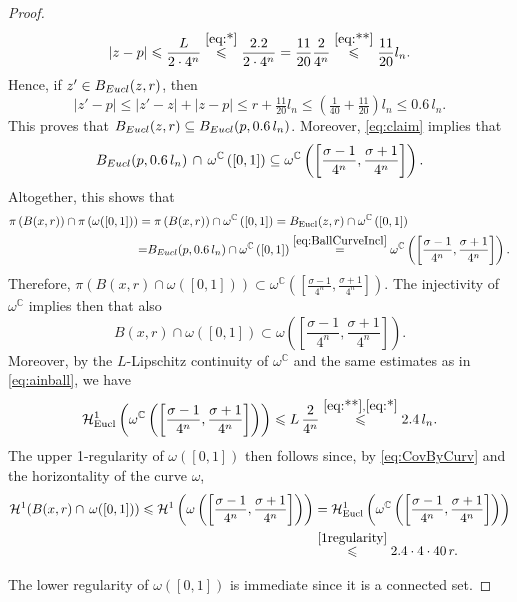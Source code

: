\documentclass[10pt,a4paper]{amsart}
\newcommand{\C}{\mathbb C}
\renewcommand{\leq}{\leqslant}
\begin{document}
\begin{proof}
  \[|z-p|\leq \frac{L}{2\cdot 4^n}\overset{\eqref{eq:*}}{\leq} \frac{2.2}{2\cdot 4^n}=\frac{11}{20}\frac{2}{4^n}\overset{\eqref{eq:**}}{\leq} \frac{11}{20}l_n.\]
  Hence, if $z'\in B_{\rm Eucl}(z,r)$, then
  \[|z'-p|\leq |z'-z|+|z-p|\leq r+\tfrac{11}{20} l_n\leq \left(\tfrac{1}{40}+\tfrac{11}{20}\right)l_n\leq 0.6\, l_n.\]
  This proves that $B_{\rm Eucl}(z,r)\subseteq B_{\rm Eucl}(p,0.6\,l_n)$. Moreover, \eqref{eq:claim} implies that
  \begin{equation}\label{eq:BallCurveIncl}
B_{\rm Eucl}(p,0.6\, l_n)\,\cap\,\omega^\C\left([0,1]\right)\subseteq \omega^\C\left(\left[\frac{\sigma-1}{4^n},\frac{\sigma +1}{4^n}\right]\right).
  \end{equation}
  Altogether, this shows that
  \begin{align*}
      \pi\left(B(x,r)\right)\cap \pi\left(\omega([0,1])\right)
     & = \pi\left(B(x,r)\right)\cap \omega^{\mathbb{C}}\left([0,1] \right)=B_{\mathrm{Eucl}}(z,r)\cap \omega^{\mathbb{C}}\left([0,1]\right)\\
  &{=}  B_{\rm Eucl}(p,0.6\,l_n)\cap \omega^{\mathbb{C}}\left([0,1]\right)
 \overset{\eqref{eq:BallCurveIncl}}{=} \omega^\C\left(\left[\frac{\sigma-1}{4^n},\frac{\sigma +1}{4^n}\right]\right).
  \end{align*}
Therefore, $\pi\left(B(x,r)\cap \omega([0,1])\right)\subset \omega^\C\left(\left[\frac{\sigma-1}{4^n},\frac{\sigma +1}{4^n}\right]\right)$. The injectivity of $\omega^{\mathbb{C}}$  implies then that also
\begin{equation}\label{eq:CovByCurv}
    B(x,r)\cap \omega([0,1]) \subset \omega\left(\left[\frac{\sigma-1}{4^n},\frac{\sigma +1}{4^n}\right]\right).
\end{equation}
Moreover,
by the $L$-Lipschitz continuity of $\omega^\C$ and the same estimates as in \eqref{eq:ainball}, we have \begin{equation}\label{1regularity}\mathcal{H}^1_{\mathrm{Eucl}}\left(\omega^\C\left(\left[\frac{\sigma-1}{4^n},\frac{\sigma +1}{4^n}\right]\right)\right)\leq L\,\frac{2}{4^n}\overset{\eqref{eq:**},\eqref{eq:*}}{\leq} 2.4\,l_n.\end{equation}
The upper 1-regularity of $\omega([0,1])$ then follows since, by \eqref{eq:CovByCurv} and the horizontality of the curve $\omega$,
  \[\begin{split}\mathcal H^1(B(x,r)\cap\, \omega([0,1]))\leq \mathcal H^1\left(\omega\left(\left[\frac{\sigma-1}{4^n},\frac{\sigma +1}{4^n}\right]\right)\right)&= \mathcal{H}^1_{\mathrm{Eucl}}\left(\omega^{\mathbb{C}}\left(\left[\frac{\sigma-1}{4^n},\frac{\sigma +1}{4^n}\right]\right)\right)\\&\overset{\eqref{1regularity}}{\leq} 2.4\cdot 4\cdot 40 \,r.\end{split}\]
 
  The lower regularity of $\omega([0,1])$ is immediate since it is a  connected set.
\end{proof}
\end{document}
